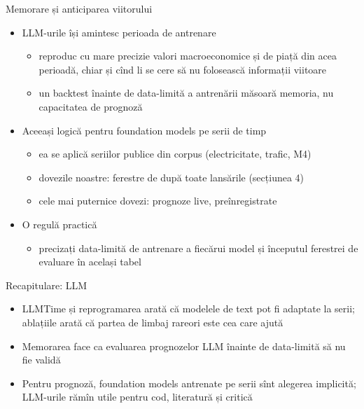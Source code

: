 \begin{frame}{Memorare și anticiparea viitorului}
\itemsize{\small}
\begin{itemize}
    \item LLM-urile își amintesc perioada de antrenare 
    \begin{itemize}
        \item reproduc cu mare precizie valori macroeconomice și de piață din acea perioadă, chiar și cînd li se cere să nu folosească informații viitoare
        \item un backtest înainte de data-limită a antrenării măsoară memoria, nu capacitatea de prognoză
    \end{itemize}
    \item Aceeași logică pentru foundation models pe serii de timp
    \begin{itemize}
        \item ea se aplică seriilor publice din corpus (electricitate, trafic, M4)
        \item dovezile noastre: ferestre de după toate lansările (secțiunea 4)
        \item cele mai puternice dovezi: prognoze live, preînregistrate
    \end{itemize}
    \item O regulă practică
    \begin{itemize}
        \item precizați data-limită de antrenare a fiecărui model și începutul ferestrei de evaluare în același tabel
    \end{itemize}
\end{itemize}
\end{frame}

\begin{frame}{Recapitulare: LLM}
\itemsize{\small}
\begin{itemize}
    \item LLMTime și reprogramarea arată că modelele de text pot fi adaptate la serii; ablațiile arată că partea de limbaj rareori este cea care ajută
    \item Memorarea face ca evaluarea prognozelor LLM înainte de data-limită să nu fie validă
    \item Pentru prognoză, foundation models antrenate pe serii sînt alegerea implicită; LLM-urile rămîn utile pentru cod, literatură și critică
\end{itemize}
\end{frame}


